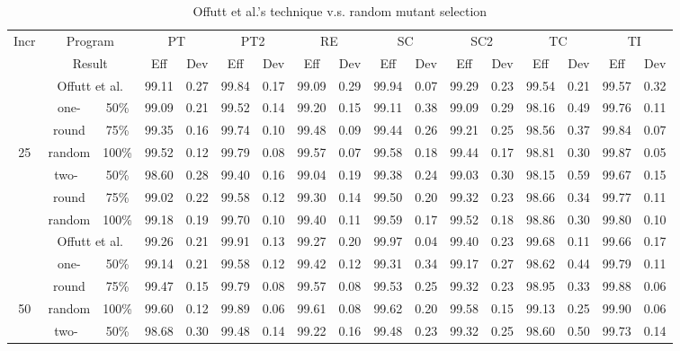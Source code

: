 \begin{table*}[t]
\caption{\label{tab:Ran-Offutt} Offutt et al.'s technique v.s.
random mutant selection} \centering \hspace*{-0.8cm}
\begin{tabular}{|c||c|c||c|c||c|c||c|c||c|c||c|c||c|c||c|c|}
  \hline
  Incr&\multicolumn{2}{|c||}{Program}
  &\multicolumn{2}{|c||}{PT}&\multicolumn{2}{|c||}{PT2}&\multicolumn{2}{|c||}{RE}&\multicolumn{2}{|c||}{SC}&\multicolumn{2}{|c||}{SC2}&\multicolumn{2}{|c||}{TC}&\multicolumn{2}{|c|}{TI}\\
  \cline{2-17}
  ~&\multicolumn{2}{|c||}{Result}
  &Eff&Dev&Eff&Dev&Eff&Dev&Eff&Dev&Eff&Dev&Eff&Dev&Eff&Dev\\
  \hline
  \hline
  ~&\multicolumn{2}{|c||}{Offutt et al.}&99.11&0.27&99.84&0.17&99.09&0.29&99.94&0.07&99.29&0.23&99.54&0.21&99.57&0.32\\
  \cline{2-17}
  ~&one-&50\%&99.09&0.21&99.52&0.14&99.20&0.15&99.11&0.38&99.09&0.29&98.16&0.49&99.76&0.11\\
  \cline{3-17}
  ~&round&75\%&99.35&0.16&99.74&0.10&99.48&0.09&99.44&0.26&99.21&0.25&98.56&0.37&99.84&0.07\\
  \cline{3-17}
  25&random&100\%&99.52&0.12&99.79&0.08&99.57&0.07&99.58&0.18&99.44&0.17&98.81&0.30&99.87&0.05\\
  \cline{2-17}
  ~&two-~&50\%&98.60&0.28&99.40&0.16&99.04&0.19&99.38&0.24&99.03&0.30&98.15&0.59&99.67&0.15\\
  \cline{3-17}
  ~&round&75\%&99.02&0.22&99.58&0.12&99.30&0.14&99.50&0.20&99.32&0.23&98.66&0.34&99.77&0.11\\
  \cline{3-17}
  ~&random&100\%&99.18&0.19&99.70&0.10&99.40&0.11&99.59&0.17&99.52&0.18&98.86&0.30&99.80&0.10\\
  \hline
  \hline
  ~&\multicolumn{2}{|c||}{Offutt et al.}&99.26&0.21&99.91&0.13&99.27&0.20&99.97&0.04&99.40&0.23&99.68&0.11&99.66&0.17\\
  \cline{2-17}
  ~&one-&50\%&99.14&0.21&99.58&0.12&99.42&0.12&99.31&0.34&99.17&0.27&98.62&0.44&99.79&0.11\\
  \cline{3-17}
  ~&round&75\%&99.47&0.15&99.79&0.08&99.57&0.08&99.53&0.25&99.32&0.23&98.95&0.33&99.88&0.06\\
  \cline{3-17}
  50&random&100\%&99.60&0.12&99.89&0.06&99.61&0.08&99.62&0.20&99.58&0.15&99.13&0.25&99.90&0.06\\
  \cline{2-17}
  ~&two-~&50\%&98.68&0.30&99.48&0.14&99.22&0.16&99.48&0.23&99.32&0.25&98.60&0.50&99.73&0.14\\

\end{tabular}
\end{table*}
